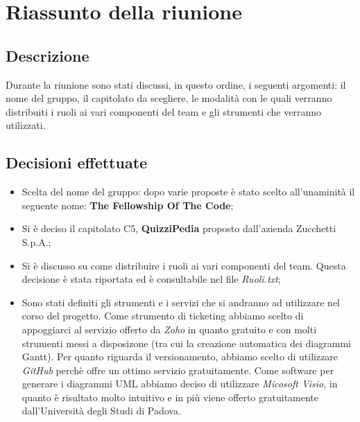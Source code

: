 \section{Riassunto della riunione}
\subsection{Descrizione}

Durante la riunione sono stati discussi, in questo ordine, i seguenti argomenti: il nome del gruppo, il capitolato da scegliere, le modalità con le quali verranno distribuiti i ruoli ai vari componenti del team e gli strumenti che verranno utilizzati.

\subsection{Decisioni effettuate}
\begin{itemize}
\item Scelta del nome del gruppo: dopo varie proposte è stato scelto all'unaminità il seguente nome: \textbf{The Fellowship Of The Code};
\item Si è deciso il capitolato C5, \textbf{QuizziPedia} proposto dall'azienda Zucchetti S.p.A.;
\item Si è discusso su come distribuire i ruoli ai vari componenti del team. Questa decisione è stata riportata ed è consultabile nel file \textsl{Ruoli.txt};
\item Sono stati definiti gli strumenti e i servizi che si andranno ad utilizzare nel corso del progetto. Come strumento di ticketing abbiamo scelto di appoggiarci al servizio offerto da \textsl{Zoho} in quanto gratuito e con molti strumenti messi a disposizone (tra cui la creazione automatica dei diagrammi Gantt). Per quanto riguarda il versionamento, abbiamo scelto di utilizzare \textsl{GitHub} perchè offre un ottimo servizio gratuitamente. Come software per generare i diagrammi UML abbiamo deciso di utilizzare \textsl{Micosoft Visio}, in quanto è risultato molto intuitivo e in più viene offerto gratuitamente dall'Università degli Studi di Padova.
\end{itemize}